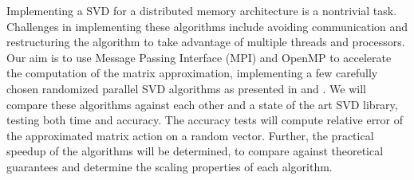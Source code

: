 \documentclass[a4paper]{article}
\begin{document}
Implementing a SVD for a distributed memory architecture is a nontrivial task.
Challenges in implementing these algorithms include avoiding communication \cite{ballard2010minimizing} and restructuring the algorithm to take advantage of multiple threads and processors.
Our aim is to use Message Passing Interface (MPI) and OpenMP to accelerate the computation of the matrix approximation, implementing a few carefully chosen randomized parallel SVD algorithms as presented in \cite{halko2011finding} and \cite{kontoghiorghes2005handbook}.
We will compare these algorithms against each other and a state of the art SVD library, testing both time and accuracy. 
The accuracy tests will compute relative error of the approximated matrix action on a random vector.
Further, the practical speedup of the algorithms will be determined, to compare against theoretical guarantees and determine the scaling properties of each algorithm.

{
}
\end{document}
